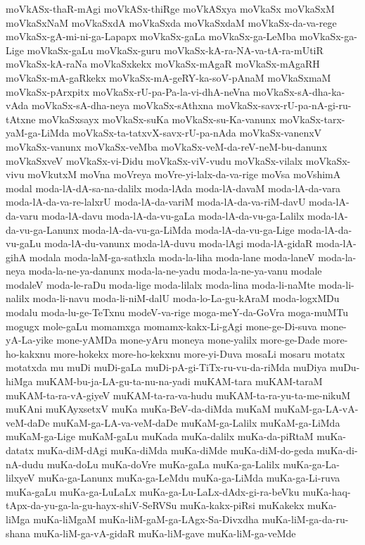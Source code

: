 {moVkASx-thaR-mAgi
moVkASx-thiRge
moVkASxya
moVkaSx
moVkaSxM
moVkaSxNaM
moVkaSxdA
moVkaSxda
moVkaSxdaM
moVkaSx-da-va-rege
moVkaSx-gA-mi-ni-ga-Lapapx
moVkaSx-gaLa
moVkaSx-ga-LeMba
moVkaSx-ga-Lige
moVkaSx-gaLu
moVkaSx-guru
moVkaSx-kA-ra-NA-va-tA-ra-mUtiR
moVkaSx-kA-raNa
moVkaSxkekx
moVkaSx-mAgaR
moVkaSx-mAgaRH
moVkaSx-mA-gaRkekx
moVkaSx-mA-geRY-ka-soV-pAnaM
moVkaSxmaM
moVkaSx-pArxpitx
moVkaSx-rU-pa-Pa-la-vi-dhA-neVna
moVkaSx-sA-dha-ka-vAda
moVkaSx-sA-dha-neya
moVkaSx-sAthxna
moVkaSx-savx-rU-pa-nA-gi-ru-tAtxne
moVkaSxsayx
moVkaSx-suKa
moVkaSx-su-Ka-vanunx
moVkaSx-tarx-yaM-ga-LiMda
moVkaSx-ta-tatxvX-savx-rU-pa-nAda
moVkaSx-vanenxV
moVkaSx-vanunx
moVkaSx-veMba
moVkaSx-veM-da-reV-neM-bu-danunx
moVkaSxveV
moVkaSx-vi-Didu
moVkaSx-viV-vudu
moVkaSx-vilalx
moVkaSx-vivu
moVkutxM
moVna
moVreya
moVre-yi-lalx-da-va-rige
moVsa
moVshimA
modal
moda-lA-dA-sa-na-dalilx
moda-lAda
moda-lA-davaM
moda-lA-da-vara
moda-lA-da-va-re-lalxrU
moda-lA-da-variM
moda-lA-da-va-riM-davU
moda-lA-da-varu
moda-lA-davu
moda-lA-da-vu-gaLa
moda-lA-da-vu-ga-Lalilx
moda-lA-da-vu-ga-Lanunx
moda-lA-da-vu-ga-LiMda
moda-lA-da-vu-ga-Lige
moda-lA-da-vu-gaLu
moda-lA-du-vanunx
moda-lA-duvu
moda-lAgi
moda-lA-gidaR
moda-lA-gihA
modala
moda-laM-ga-sathxla
moda-la-liha
moda-lane
moda-laneV
moda-la-neya
moda-la-ne-ya-danunx
moda-la-ne-yadu
moda-la-ne-ya-vanu
modale
modaleV
moda-le-raDu
moda-lige
moda-lilalx
moda-lina
moda-li-naMte
moda-li-nalilx
moda-li-navu
moda-li-niM-dalU
moda-lo-La-gu-kAraM
moda-logxMDu
modalu
moda-lu-ge-TeTxnu
modeV-va-rige
moga-meY-da-GoVra
moga-muMTu
mogugx
mole-gaLu
momamxga
momamx-kakx-Li-gAgi
mone-ge-Di-suva
mone-yA-La-yike
mone-yAMDa
mone-yAru
moneya
mone-yalilx
more-ge-Dade
more-ho-kakxnu
more-hokekx
more-ho-kekxnu
more-yi-Duva
mosaLi
mosaru
motatx
motatxda
mu
muDi
muDi-gaLa
muDi-pA-gi-TiTx-ru-vu-da-riMda
muDiya
muDu-hiMga
muKAM-bu-ja-LA-gu-ta-nu-na-yadi
muKAM-tara
muKAM-taraM
muKAM-ta-ra-vA-giyeV
muKAM-ta-ra-va-hudu
muKAM-ta-ra-yu-ta-me-nikuM
muKAni
muKAyxsetxV
muKa
muKa-BeV-da-diMda
muKaM
muKaM-ga-LA-vA-veM-daDe
muKaM-ga-LA-va-veM-daDe
muKaM-ga-Lalilx
muKaM-ga-LiMda
muKaM-ga-Lige
muKaM-gaLu
muKada
muKa-dalilx
muKa-da-piRtaM
muKa-datatx
muKa-diM-dAgi
muKa-diMda
muKa-diMde
muKa-diM-do-geda
muKa-di-nA-dudu
muKa-doLu
muKa-doVre
muKa-gaLa
muKa-ga-Lalilx
muKa-ga-La-lilxyeV
muKa-ga-Lanunx
muKa-ga-LeMdu
muKa-ga-LiMda
muKa-ga-Li-ruva
muKa-gaLu
muKa-ga-LuLaLx
muKa-ga-Lu-LaLx-dAdx-gi-ra-beVku
muKa-haq-tApx-da-yu-ga-la-gu-hayx-shiV-SeRVSu
muKa-kakx-piRsi
muKakekx
muKa-liMga
muKa-liMgaM
muKa-liM-gaM-ga-LAgx-Sa-Divxdha
muKa-liM-ga-da-ru-shana
muKa-liM-ga-vA-gidaR
muKa-liM-gave
muKa-liM-ga-veMde
}
